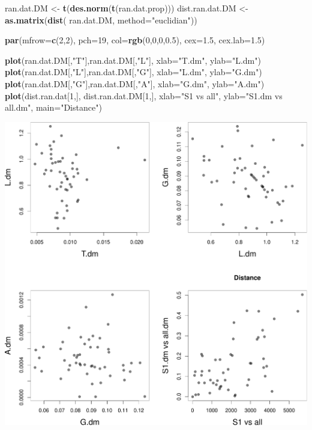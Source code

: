 \documentclass[twocolumn]{article}
\newenvironment{Shaded}{\begin{snugshade}}{\end{snugshade}}
\newcommand{\KeywordTok}[1]{\textcolor[rgb]{0.13,0.29,0.53}{\textbf{{#1}}}}
\newcommand{\DataTypeTok}[1]{\textcolor[rgb]{0.13,0.29,0.53}{{#1}}}
\newcommand{\DecValTok}[1]{\textcolor[rgb]{0.00,0.00,0.81}{{#1}}}
\newcommand{\FloatTok}[1]{\textcolor[rgb]{0.00,0.00,0.81}{{#1}}}
\newcommand{\StringTok}[1]{\textcolor[rgb]{0.31,0.60,0.02}{{#1}}}
\newcommand{\NormalTok}[1]{{#1}}
\begin{document}
\begin{Shaded}
\begin{Highlighting}[]
\NormalTok{ran.dat.DM <-}\StringTok{ }\KeywordTok{t}\NormalTok{(}\KeywordTok{des.norm}\NormalTok{(}\KeywordTok{t}\NormalTok{(ran.dat.prop)))}
\NormalTok{dist.ran.dat.DM <-}\StringTok{ }\KeywordTok{as.matrix}\NormalTok{(}\KeywordTok{dist}\NormalTok{(}
    \NormalTok{ran.dat.DM, }\DataTypeTok{method=}\StringTok{"euclidian"}\NormalTok{))}

\KeywordTok{par}\NormalTok{(}\DataTypeTok{mfrow=}\KeywordTok{c}\NormalTok{(}\DecValTok{2}\NormalTok{,}\DecValTok{2}\NormalTok{), }\DataTypeTok{pch=}\DecValTok{19}\NormalTok{, }\DataTypeTok{col=}\KeywordTok{rgb}\NormalTok{(}\DecValTok{0}\NormalTok{,}\DecValTok{0}\NormalTok{,}\DecValTok{0}\NormalTok{,}\FloatTok{0.5}\NormalTok{),}
    \DataTypeTok{cex=}\FloatTok{1.5}\NormalTok{, }\DataTypeTok{cex.lab=}\FloatTok{1.5}\NormalTok{)}

\KeywordTok{plot}\NormalTok{(ran.dat.DM[,}\StringTok{"T"}\NormalTok{],ran.dat.DM[,}\StringTok{"L"}\NormalTok{],}
    \DataTypeTok{xlab=}\StringTok{"T.dm"}\NormalTok{, }\DataTypeTok{ylab=}\StringTok{"L.dm"}\NormalTok{)}
\KeywordTok{plot}\NormalTok{(ran.dat.DM[,}\StringTok{"L"}\NormalTok{],ran.dat.DM[,}\StringTok{"G"}\NormalTok{],}
    \DataTypeTok{xlab=}\StringTok{"L.dm"}\NormalTok{, }\DataTypeTok{ylab=}\StringTok{"G.dm"}\NormalTok{)}
\KeywordTok{plot}\NormalTok{(ran.dat.DM[,}\StringTok{"G"}\NormalTok{],ran.dat.DM[,}\StringTok{"A"}\NormalTok{],}
    \DataTypeTok{xlab=}\StringTok{"G.dm"}\NormalTok{, }\DataTypeTok{ylab=}\StringTok{"A.dm"}\NormalTok{)}
\KeywordTok{plot}\NormalTok{(dist.ran.dat[}\DecValTok{1}\NormalTok{,], dist.ran.dat.DM[}\DecValTok{1}\NormalTok{,],}
    \DataTypeTok{xlab=}\StringTok{"S1 vs all"}\NormalTok{, }\DataTypeTok{ylab=}\StringTok{"S1.dm vs all.dm"}\NormalTok{,}
    \DataTypeTok{main=}\StringTok{"Distance"}\NormalTok{)}
\end{Highlighting}
\end{Shaded}

\includegraphics{main_files/figure-latex/R_block_random_DM-1.pdf}
\end{document}
